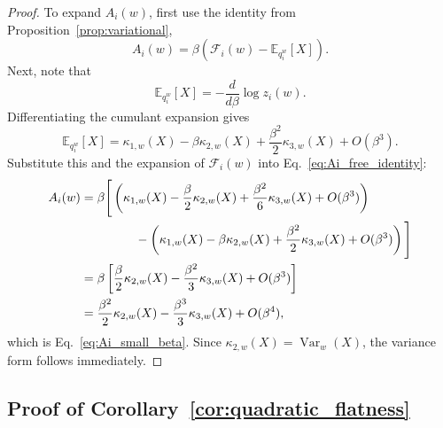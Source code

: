 \documentclass{article}
\newcommand{\EE}{\mathbb{E}}
\newcommand{\Var}{\operatorname{Var}}
\newcommand{\free}{\mathcal{F}}
\begin{document}
\begin{proof}
To expand \(A_i(w)\), first use the identity from Proposition~\ref{prop:variational},
\begin{equation}
    A_i(w)=\beta\left(\free_i(w)-\EE_{q_i^w}[X]\right).
    \label{eq:Ai_free_identity}
\end{equation}
Next, note that
\begin{equation}
    \EE_{q_i^w}[X]
    =
    -\frac{d}{d\beta}\log z_i(w).
\end{equation}
Differentiating the cumulant expansion gives
\begin{equation}
    \EE_{q_i^w}[X]
    =
    \kappa_{1,w}(X)
    -
    \beta \kappa_{2,w}(X)
    +
    \frac{\beta^2}{2}\kappa_{3,w}(X)
    +
    O(\beta^3).
\end{equation}
Substitute this and the expansion of \(\free_i(w)\) into Eq.~\eqref{eq:Ai_free_identity}:
\begin{align}
    A_i(w)
    &=
    \beta \Bigg[
        \left(
            \kappa_{1,w}(X)
            - \frac{\beta}{2}\kappa_{2,w}(X)
            + \frac{\beta^2}{6}\kappa_{3,w}(X)
            + O(\beta^3)
        \right) \\
        &\hspace{4.4em} -
        \left(
            \kappa_{1,w}(X)
            - \beta \kappa_{2,w}(X)
            + \frac{\beta^2}{2}\kappa_{3,w}(X)
            + O(\beta^3)
        \right)
    \Bigg] \\
    &=
    \beta \left[
        \frac{\beta}{2}\kappa_{2,w}(X)
        - \frac{\beta^2}{3}\kappa_{3,w}(X)
        + O(\beta^3)
    \right] \\
    &=
    \frac{\beta^2}{2}\kappa_{2,w}(X)
    - \frac{\beta^3}{3}\kappa_{3,w}(X)
    + O(\beta^4),
\end{align}
which is Eq.~\eqref{eq:Ai_small_beta}. Since \(\kappa_{2,w}(X)=\Var_w(X)\), the variance form follows immediately. \qedhere
\end{proof}

\subsection{Proof of Corollary~\ref{cor:quadratic_flatness}}
\end{document}
